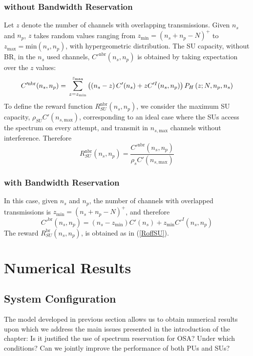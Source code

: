 \subsubsection{without Bandwidth Reservation}
Let $z$ denote the number of channels with overlapping transmissions. Given $n_{s}$ and $n_{p}$, $z$ takes random values ranging from $z_{\text{min}}=\left(n_{s}+n_{p}-N\right)^{+}$ to $z_{\text{max}}=\text{min}\left(n_{s},n_{p}\right)$, with hypergeometric distribution. The SU capacity, without BR, in the $n_{s}$ used channels, $C'^{\text{nbr}}(n_{s},n_{p})$ is obtained by taking expectation over the $z$ values:
\begin{equation}
C'^{\text{nbr}}(n_{s},n_{p}) = \\ \displaystyle\sum_{z=z_{\text{min}}}^{z_{\text{max}}}\left(\left(n_{s}-z\right)C'(n_{s})+zC'^{I}(n_{s},n_{p})\right)P_{H}\left(z;N,n_{p},n_{s}\right)
\end{equation}
To define the reward function $R^{\text{nbr}}_{SU}\left(n_{s},n_{p}\right)$, we consider the maximum SU capacity, $\rho_{SU}C'(n_{s,\text{max}})$, corresponding to an ideal case where the SUs access the spectrum on every attempt, and transmit in $n_{s,\text{max}}$ channels without interference. Therefore
\begin{equation}\label{RoffSU}
R^{\text{nbr}}_{SU}\left(n_{s},n_{p}\right) = \frac{C'^{\text{nbr}}(n_{s},n_{p})}{\rho_{s}C'(n_{s,\text{max}})}
\end{equation}

\subsubsection{with Bandwidth Reservation}
In this case, given $n_{s}$ and $n_{p}$, the number of channels with overlapped transmissions is $z_{\text{min}}=\left(n_{s}+n_{p}-N\right)^{+}$, and therefore
\begin{equation}
C'^{\text{br}}(n_{s},n_{p}) =\left(n_{s}-z_{\text{min}}\right)C'(n_{s})+z_{\text{min}}C'^{I}(n_{s},n_{p})
\end{equation}
The reward $R^{\text{br}}_{SU}\left(n_{s},n_{p}\right)$, is obtained as in (\ref{RoffSU}).


\section{Numerical Results}\label{sec:Results}
\subsection{System Configuration}
The model developed in previous section allows us to obtain numerical results upon which we address the main issues presented in the introduction of the chapter: Is it justified the use of spectrum reservation for OSA? Under which conditions? Can we jointly improve the performance of both PUs and SUs?

